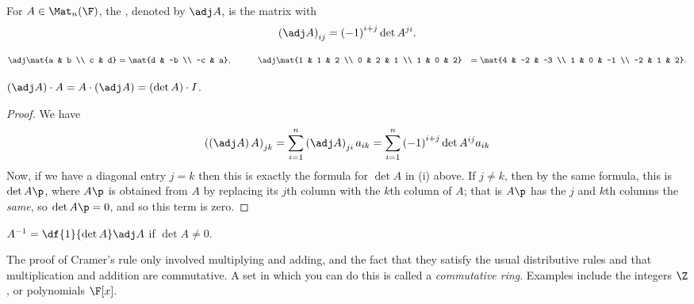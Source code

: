 \begin{definition}
	For $A\in\Mat_n(\F)$, the , denoted by $\adj A$, is the matrix with %
	\begin{equation*}
		\left( \adj A \right)_{ij} = \left( -1 \right)^{i+j} \det A^{ji}.
	\end{equation*}
\end{definition}

\begin{example}
	\begin{align*}
		\adj\mat{a & b \\ c & d}
		&= \mat{d & -b \\ -c & a}, \qquad\quad \adj\mat{1 & 1 & 2 \\ 0 & 2 & 1 \\ 1 & 0 & 2} 
		&= \mat{4 & -2 & -3 \\ 1 & 0 & -1 \\ -2 & 1 & 2}.
	\end{align*}
\end{example}

\bigskip


\begin{theorem}
	 $\left( \adj A \right) \cdot A = A \cdot \left( \adj A \right) = \left( \det A \right) \cdot I$. %
\end{theorem}

\begin{proof}
	We have %
	\begin{equation*}
		  \left( \left( \adj A \right) A \right)_{jk}
		= \sum_{i=1}^n \left( \adj A \right)_{ji} a_{ik}
		= \sum_{i=1}^n \left( -1 \right)^{i+j} \det A^{ij} a_{ik}
	\end{equation*}
	Now, if we have a diagonal entry $j=k$  then this is exactly the formula for $\det A$ in (i) above. If $j\neq k$, then by the same formula, this is $\det A\p$, where $A\p$ is obtained from $A$ by replacing its $j$th column with the $k$th column of $A$; that is $A\p$ has the $j$ and $k$th columns the \emph{same}, so $\det A\p=0$, and so this term is zero.%
\end{proof}

\begin{corollary}
	$A^{-1}=\df{1}{\det A}  \adj A$ if $\det A\neq 0$. %
\end{corollary}
\vspace{-6pt}

The proof of Cramer's rule only involved multiplying and adding, and the fact that they satisfy the usual distributive rules and that multiplication and addition are commutative. A set in which you can do this is called a \emph{commutative ring}. Examples include the integers $\Z$, or polynomials $\F[x]$.

